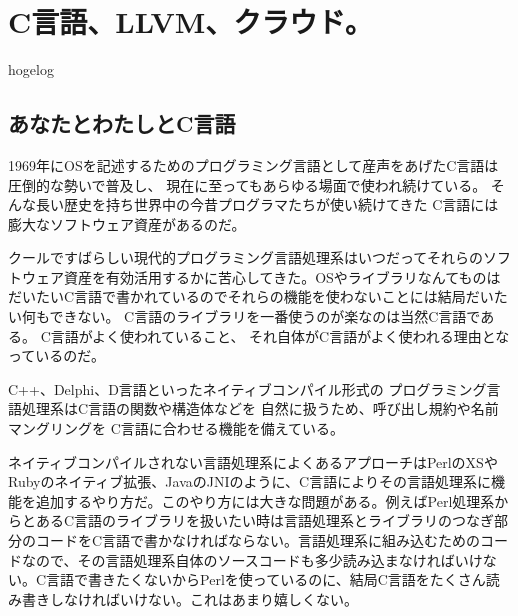 
\chapter{C言語、LLVM、クラウド。}

\begin{flushright}
 hogelog
\end{flushright}

\section{あなたとわたしとC言語}
1969年にOSを記述するためのプログラミング言語として産声をあげたC言語は圧倒的な勢いで普及し、
現在に至ってもあらゆる場面で使われ続けている。
そんな長い歴史を持ち世界中の今昔プログラマたちが使い続けてきた
C言語には膨大なソフトウェア資産があるのだ。

クールですばらしい現代的プログラミング言語処理系はいつだってそれらのソフトウェア資産を有効活用するかに苦心してきた。OSやライブラリなんてものはだいたいC言語で書かれているのでそれらの機能を使わないことには結局だいたい何もできない。
C言語のライブラリを一番使うのが楽なのは当然C言語である。
C言語がよく使われていること、
それ自体がC言語がよく使われる理由となっているのだ。

C++、Delphi、D言語といったネイティブコンパイル形式の
プログラミング言語処理系はC言語の関数や構造体などを
自然に扱うため、呼び出し規約や名前マングリングを
C言語に合わせる機能を備えている。

ネイティブコンパイルされない言語処理系によくあるアプローチはPerlのXSやRubyのネイティブ拡張、JavaのJNIのように、C言語によりその言語処理系に機能を追加するやり方だ。このやり方には大きな問題がある。例えばPerl処理系からとあるC言語のライブラリを扱いたい時は言語処理系とライブラリのつなぎ部分のコードをC言語で書かなければならない。言語処理系に組み込むためのコードなので、その言語処理系自体のソースコードも多少読み込まなければいけない。C言語で書きたくないからPerlを使っているのに、結局C言語をたくさん読み書きしなければいけない。これはあまり嬉しくない。


